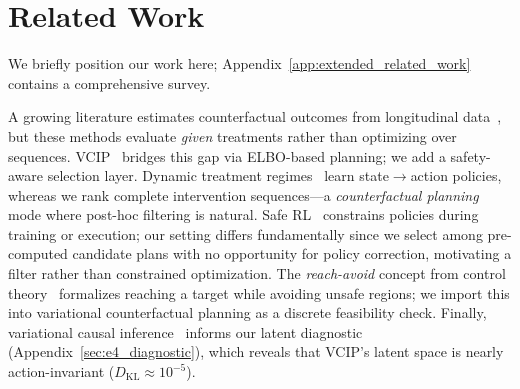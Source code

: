\documentclass{article}
\newcommand{\KL}{\mathrm{KL}}
\begin{document}
\section{Related Work}
\label{sec:related}

We briefly position our work here; Appendix~\ref{app:extended_related_work} contains a comprehensive survey.

\vspace{-0.5em}
A growing literature estimates counterfactual outcomes from longitudinal data~\citep{bica2020crn, melnychuk2022causal, lim2018forecasting, seedat2022actin}, but these methods evaluate \emph{given} treatments rather than optimizing over sequences. VCIP~\citep{melnychuk2025vcip} bridges this gap via ELBO-based planning; we add a safety-aware selection layer. Dynamic treatment regimes~\citep{murphy2003optimal, chakraborty2014dynamic} learn state$\to$action policies, whereas we rank complete intervention sequences---a \emph{counterfactual planning} mode where post-hoc filtering is natural. Safe RL~\citep{garcia2015comprehensive, achiam2017constrained, stooke2020responsive} constrains policies during training or execution; our setting differs fundamentally since we select among pre-computed candidate plans with no opportunity for policy correction, motivating a filter rather than constrained optimization. The \emph{reach-avoid} concept from control theory~\citep{mitchell2005reach, fisac2015reach} formalizes reaching a target while avoiding unsafe regions; we import this into variational counterfactual planning as a discrete feasibility check. Finally, variational causal inference~\citep{louizos2017cevae, wu2025vci} informs our latent diagnostic (Appendix~\ref{sec:e4_diagnostic}), which reveals that VCIP's latent space is nearly action-invariant ($D_{\KL} \approx 10^{-5}$).

\vspace{-0.5em}
\end{document}

